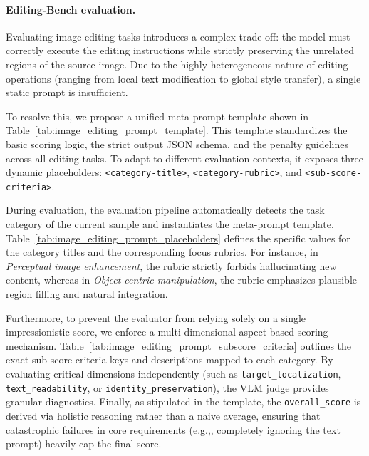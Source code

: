 \documentclass{llmxive}
\providecommand{\eg}{e.g.,\xspace}
\begin{document}
\paragraph{Editing-Bench evaluation.} 
Evaluating image editing tasks introduces a complex trade-off: the model must correctly execute the editing instructions while strictly preserving the unrelated regions of the source image. Due to the highly heterogeneous nature of editing operations (ranging from local text modification to global style transfer), a single static prompt is insufficient.

To resolve this, we propose a unified meta-prompt template shown in Table~\ref{tab:image_editing_prompt_template}. This template standardizes the basic scoring logic, the strict output JSON schema, and the penalty guidelines across all editing tasks. To adapt to different evaluation contexts, it exposes three dynamic placeholders: \texttt{<category-title>}, \texttt{<category-rubric>}, and \texttt{<sub-score-criteria>}.

During evaluation, the evaluation pipeline automatically detects the task category of the current sample and instantiates the meta-prompt template. Table~\ref{tab:image_editing_prompt_placeholders} defines the specific values for the category titles and the corresponding focus rubrics. For instance, in \textit{Perceptual image enhancement}, the rubric strictly forbids hallucinating new content, whereas in \textit{Object-centric manipulation}, the rubric emphasizes plausible region filling and natural integration.

Furthermore, to prevent the evaluator from relying solely on a single impressionistic score, we enforce a multi-dimensional aspect-based scoring mechanism. Table~\ref{tab:image_editing_prompt_subscore_criteria} outlines the exact sub-score criteria keys and descriptions mapped to each category. By evaluating critical dimensions independently (such as \texttt{target\_localization}, \texttt{text\_readability}, or \texttt{identity\_preservation}), the VLM judge provides granular diagnostics. Finally, as stipulated in the template, the \texttt{overall\_score} is derived via holistic reasoning rather than a naive average, ensuring that catastrophic failures in core requirements (\eg, completely ignoring the text prompt) heavily cap the final score.
\end{document}
